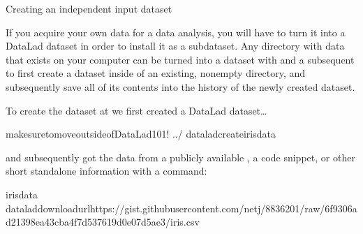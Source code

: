 \ignorespaces \begin{findoutmore}[label={fom-iris}, before title={\thetcbcounter\ }, check odd page=true]{Creating an independent input dataset}
\label{\detokenize{basics/101-130-yodaproject:fom-iris}}

\sphinxAtStartPar
If you acquire your own data for a data analysis, you will have
to turn it into a DataLad dataset in order to install it as a subdataset.
Any directory with data that exists on
your computer can be turned into a dataset with 
and a subsequent  to first create a dataset inside of
an existing, non\sphinxhyphen{}empty directory, and subsequently save all of its contents into
the history of the newly created dataset.

\sphinxAtStartPar
To create the  dataset at 
we first created a DataLad dataset…

\begin{sphinxVerbatim}[commandchars=\\\{\}]
makesuretomoveoutsideofDataLad\PYGZhy{}101!
../
dataladcreateiris\PYGZus{}data
\end{sphinxVerbatim}

\sphinxAtStartPar
and subsequently got the data from a publicly available
, a code snippet, or other short standalone information with a
 command:

\begin{sphinxVerbatim}[commandchars=\\\{\}]
iris\PYGZus{}data
dataladdownload\PYGZhy{}urlhttps://gist.githubusercontent.com/netj/8836201/raw/6f9306ad21398ea43cba4f7d537619d0e07d5ae3/iris.csv
\end{sphinxVerbatim}


\end{findoutmore}
